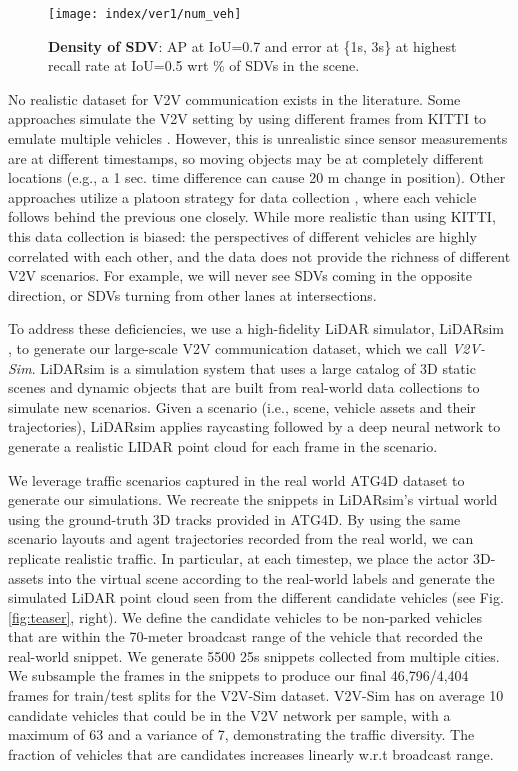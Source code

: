 \documentclass[runningheads]{llncs}
\begin{document}
\begin{figure}[t]
  \centering
  \texttt{[image: index/ver1/num\_veh]}
\caption{{\bf Density of SDV}: AP at IoU=0.7 and  error at \{1s, 3s\} at highest recall rate at IoU=0.5 wrt  \% of SDVs in the scene.}
\label{fig:num_veh}
\end{figure}

No realistic dataset for V2V communication exists in the literature.
Some approaches simulate the V2V setting by using different frames from KITTI \cite{geiger2012we} to emulate multiple vehicles \cite{maalej2017vanets,xiao2018multimedia,chen2019cooper}.
However, this is 
unrealistic 
since sensor measurements are at different timestamps, 
so moving objects may be at completely different locations (e.g., a 1 sec. time difference can cause 20 m change in position).
Other approaches utilize a platoon
strategy for data collection \cite{chen2015dsrc,kim2014multivehicle,yuan2017object,rawashdeh2018collaborative}, where each vehicle  follows behind the previous one closely.
While more realistic than using KITTI,  this data collection is biased: the perspectives of different vehicles are highly correlated with each other, and the data does not provide the richness of different V2V scenarios.
For example, we will never see SDVs  coming in the opposite direction, or SDVs
turning from other lanes at intersections.

To address these deficiencies, we use a high-fidelity LiDAR simulator, LiDARsim \cite{siva2019lidarsim}, to generate our large-scale V2V communication dataset, which we call {\it V2V-Sim}. LiDARsim is a simulation system that uses a large catalog of 3D static scenes and dynamic objects that are built 
from
real-world data collections 
to simulate new scenarios. 
Given a scenario (i.e., scene, vehicle assets and their trajectories), LiDARsim  applies raycasting followed by  a deep neural network to generate a realistic LIDAR point cloud for each frame in the scenario.

We leverage traffic scenarios captured in the real world ATG4D dataset \cite{yang2018pixor} to generate our simulations. We recreate the snippets in LiDARsim's virtual world using the ground-truth 3D tracks provided in ATG4D. By using the same scenario layouts and agent trajectories recorded from the real world, we 
can
replicate realistic traffic.
In particular, at each timestep, we place the actor 3D-assets into the virtual scene according to the real-world labels and generate the simulated LiDAR point cloud seen from the different candidate vehicles (see Fig. \ref{fig:teaser}, right). 
We define the candidate vehicles to be non-parked vehicles that are within the 70-meter broadcast range of the vehicle that recorded the real-world snippet. 
We generate 5500 25s snippets collected from multiple cities. We subsample the frames in the snippets to produce our final  46,796/4,404 frames for train/test splits for the V2V-Sim dataset.
V2V-Sim has on average 10 candidate vehicles that could be in the V2V network per sample, with a maximum of 63 and a variance of 7, demonstrating the traffic diversity. 
The fraction of vehicles that are 
candidates 
increases linearly w.r.t broadcast range.
\end{document}
